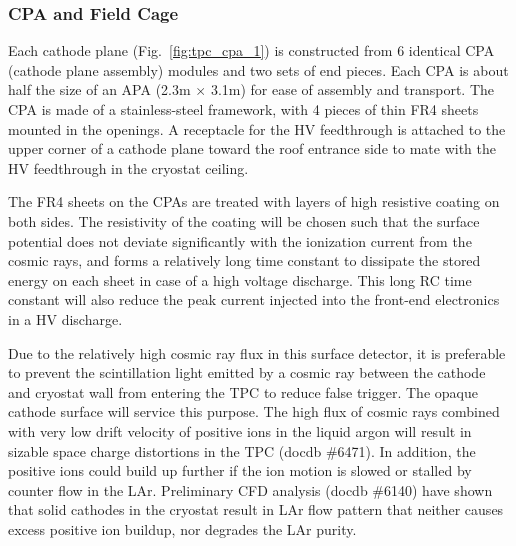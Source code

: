 \subsubsection{CPA and Field Cage}



Each cathode plane (Fig.~\ref{fig:tpc_cpa_1}) is constructed from 6 identical CPA (cathode plane assembly) modules and two sets of end pieces. Each CPA is about half the size of an APA  (2.3m $\times$ 3.1m) for ease of assembly and transport.  The CPA is made of a stainless-steel framework, 
with 4 pieces of thin FR4 sheets mounted in the openings.  A receptacle for the HV feedthrough is attached to the upper corner of a cathode plane toward the roof entrance side to mate with the HV feedthrough in the cryostat ceiling. 

The FR4 sheets on the CPAs are treated with layers of high resistive coating on both sides.  The resistivity of the coating will be chosen such that the surface potential does not deviate significantly with the ionization current from the cosmic rays, and forms a relatively long time constant to dissipate the stored energy on each sheet in case of a high voltage discharge.  This long RC time constant will also reduce the peak current injected into the front-end electronics in a HV discharge.

Due to the relatively high cosmic ray flux in this surface detector, it is preferable to prevent the scintillation light emitted by a cosmic ray between the cathode and cryostat wall from entering the TPC to reduce false trigger. The opaque cathode surface will service this purpose. The high flux of cosmic rays combined with very low drift velocity of positive ions in the liquid argon will result in sizable space charge distortions in the TPC (docdb \#6471).  In addition, the positive ions could build up further if the ion motion is slowed or stalled by counter flow in the LAr.  Preliminary CFD analysis (docdb \#6140) have shown that solid cathodes in the cryostat result in LAr flow pattern that neither causes excess positive ion buildup, nor degrades the LAr purity.


